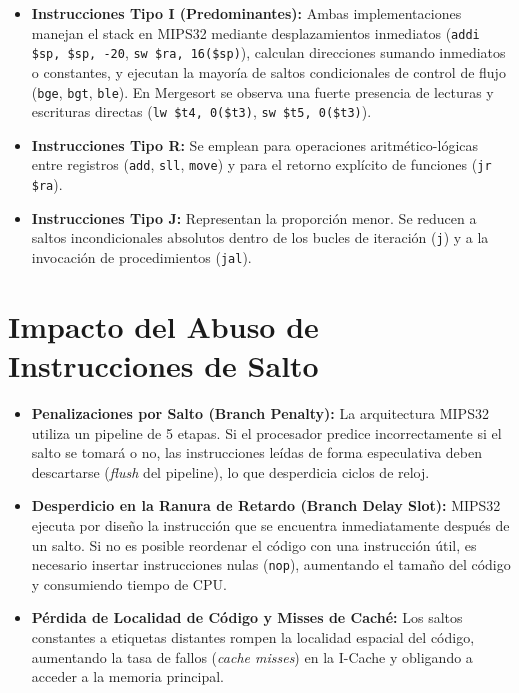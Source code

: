 \documentclass[12pt,a4paper]{article}
\begin{document}
	\begin{itemize}
		\item \textbf{Instrucciones Tipo I (Predominantes):} Ambas implementaciones manejan el stack en MIPS32 mediante desplazamientos inmediatos (\texttt{addi \$sp, \$sp, -20}, \texttt{sw \$ra, 16(\$sp)}), calculan direcciones sumando inmediatos o constantes, y ejecutan la mayoría de saltos condicionales de control de flujo (\texttt{bge}, \texttt{bgt}, \texttt{ble}). En Mergesort se observa una fuerte presencia de lecturas y escrituras directas (\texttt{lw \$t4, 0(\$t3)}, \texttt{sw \$t5, 0(\$t3)}).
		\item \textbf{Instrucciones Tipo R:} Se emplean para operaciones aritmético-lógicas entre registros (\texttt{add}, \texttt{sll}, \texttt{move}) y para el retorno explícito de funciones (\texttt{jr \$ra}).
		\item \textbf{Instrucciones Tipo J:} Representan la proporción menor. Se reducen a saltos incondicionales absolutos dentro de los bucles de iteración (\texttt{j}) y a la invocación de procedimientos (\texttt{jal}).
	\end{itemize}
	
	
	\section{Impacto del Abuso de Instrucciones de Salto}
	
	\begin{itemize}
		\item \textbf{Penalizaciones por Salto (Branch Penalty):} La arquitectura MIPS32 utiliza un pipeline de 5 etapas. Si el procesador predice incorrectamente si el salto se tomará o no, las instrucciones leídas de forma especulativa deben descartarse (\textit{flush} del pipeline), lo que desperdicia ciclos de reloj.
		\item \textbf{Desperdicio en la Ranura de Retardo (Branch Delay Slot):} MIPS32 ejecuta por diseño la instrucción que se encuentra inmediatamente después de un salto. Si no es posible reordenar el código con una instrucción útil, es necesario insertar instrucciones nulas (\texttt{nop}), aumentando el tamaño del código y consumiendo tiempo de CPU.
		\item \textbf{Pérdida de Localidad de Código y Misses de Caché:} Los saltos constantes a etiquetas distantes rompen la localidad espacial del código, aumentando la tasa de fallos (\textit{cache misses}) en la I-Cache y obligando a acceder a la memoria principal.
	\end{itemize}
	
\end{document}
